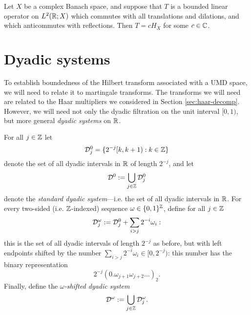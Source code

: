 \begin{prop}\label{prop:HT-char}
  Let $X$ be a complex Banach space, and suppose that $T$ is a bounded linear operator on $L^2(\mathbb{R};X)$ which commutes with all translations and dilations, and which anticommutes with reflections.
  Then $T = cH_{X}$ for some $c \in \mathbb{C}$.
\end{prop}


\section{Dyadic systems}

To establish boundedness of the Hilbert transform associated with a UMD space, we will need to relate it to martingale transforms.
The transforms we will need are related to the Haar multipliers we considered in Section \ref{sec:haar-decomp}.
However, we will need not only the dyadic filtration on the unit interval $[0,1)$, but more general \emph{dyadic systems} on $\mathbb{R}$.

\begin{defn}
  For all $j \in \mathbb{Z}$ let
  \begin{equation*}
    \mathcal{D}_{j}^{0} = \{2^{-j}[k, k+1) : k \in \mathbb{Z}\}
  \end{equation*}
  denote the set of all dyadic intervals in $\mathbb{R}$ of length $2^{-j}$, and let
  \begin{equation*}
    \mathcal{D}^{0} := \bigcup_{j \in \mathbb{Z}} \mathcal{D}_{j}^{0}
  \end{equation*}
  denote the \emph{standard dyadic system}---i.e. the set of all dyadic intervals in $\mathbb{R}$.
  For every two-sided (i.e. $\mathbb{Z}$-indexed) sequence $\omega \in \{0,1\}^{\mathbb{Z}}$, define for all $j \in \mathbb{Z}$
  \begin{equation*}
    \mathcal{D}_{j}^{\omega} := \mathcal{D}_{j}^{0} + \sum_{i > j} 2^{-i} \omega_{i}:
  \end{equation*}
  this is the set of all dyadic intervals of length $2^{-j}$ as before, but with left endpoints shifted by the number $\sum_{i > j} 2^{-i} \omega_{i} \in [0,2^{-j})$: this number has the binary representation
  \begin{equation*}
    2^{-j}(0.\omega_{j+1}\omega_{j+2}\ldots)_{2} .
  \end{equation*}
  Finally, define the \emph{$\omega$-shifted dyadic system}
  \begin{equation*}
   \mathcal{D}^{\omega} := \bigcup_{j \in \mathbb{Z}} \mathcal{D}_{j}^{\omega}.
  \end{equation*}
\end{defn}


